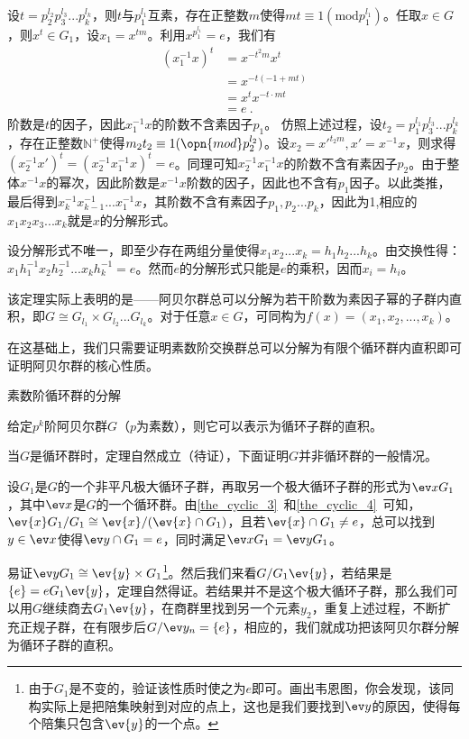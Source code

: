 设$t=p_2^{l_2}p_3^{l_3}...p_k^{l_k}$，则$t$与$p_1^{l_1}$互素，存在正整数$m$使得$mt\equiv 1(\mathrm {mod} p_1^{l_1})$。任取$x\in G$，则$x^t\in G_1$，设$x_1=x^{tm}$。利用$x^{p_1^{l_1}}=e$，我们有
\begin{equation}
\begin{aligned}
(x_1^{-1}x)^t&=x^{-t^2m}x^t\\
&=x^{-t(-1+mt)}\\
&=x^tx^{-t\cdot mt}\\
&=e~.
\end{aligned}
\end{equation}
阶数是$t$的因子，因此$x_1^{-1}x$的阶数不含素因子$p_1$。
仿照上述过程，设$t_2=p_1^{l_1}p_3^{l_3}...p_k^{l_k}$，存在正整数$\mathbb N^{+}$使得$m_2t_2\equiv 1(\opn{mod}p_2^{l_2})$。设$x_2=x'^{t_2m},x'=x^{-1}x$，则求得$(x_2^{-1}x')^t=(x_2^{-1}x_1^{-1}x)^t=e$。同理可知$x_2^{-1}x_1^{-1}x$的阶数不含有素因子$p_2$。由于整体$x^{-1}x$的幂次，因此阶数是$x^{-1}x$阶数的因子，因此也不含有$p_1$因子。以此类推，最后得到$x_k^{-1}x_{k-1}^{-1}...x_1^{-1}x$，其阶数不含有素因子$p_1,p_2...p_k$，因此为1,相应的$x_1x_2x_3...x_k$就是$x$的分解形式。

设分解形式不唯一，即至少存在两组分量使得$x_1x_2...x_k=h_1h_2...h_k$。由交换性得：$x_1h_1^{-1}x_2h_2^{-1}...x_kh_k^{-1}=e$。然而$e$的分解形式只能是$e$的乘积，因而$x_i=h_i$。

该定理实际上表明的是——阿贝尔群总可以分解为若干阶数为素因子幂的子群内直积，即$G\cong G_{l_1}\times G_{l_2}...G_{l_k}$。对于任意$x\in G$，可同构为$f(x)=(x_1,x_2,...,x_k)$。

在这基础上，我们只需要证明素数阶交换群总可以分解为有限个循环群内直积即可证明阿贝尔群的核心性质。
\begin{example}{素数阶循环群的分解}

\end{example}
\begin{theorem}{}
给定$p^k$阶阿贝尔群$G$（$p$为素数），则它可以表示为循环子群的直积。
\end{theorem}
当$G$是循环群时，定理自然成立（待证），下面证明$G$并非循环群的一般情况。

设$G_1$是$G$的一个非平凡极大循环子群，再取另一个极大循环子群的形式为$\ev x G_1$，其中$\ev x$是$G$的一个循环群。由\autoref{the_cyclic_3}~和\autoref{the_cyclic_4}~可知，$\ev{x}G_1/G_1\cong \ev{x}/(\ev{x}\cap G_1)$，且若$\ev{x}\cap G_1\neq {e}$，总可以找到$y\in \ev x$使得$\ev y\cap G_1={e}$，同时满足$\ev xG_1=\ev y G_1$。

易证$\ev yG_1\cong \ev{y}\times G_1$\footnote{由于$G_1$是不变的，验证该性质时使之为$e$即可。画出韦恩图，你会发现，该同构实际上是把陪集映射到对应的点上，这也是我们要找到$\ev y$的原因，使得每个陪集只包含$\ev{y}$的一个点。}。然后我们来看$G/G_1\ev{y}$，若结果是$\{e\}=eG_1\ev{y}$，定理自然得证。若结果并不是这个极大循环子群，那么我们可以用$G$继续商去$G_1\ev{y}$，在商群里找到另一个元素$y_2$，重复上述过程，不断扩充正规子群，在有限步后$G/{\ev y_n}=\{e\}$，相应的，我们就成功把该阿贝尔群分解为循环子群的直积。


